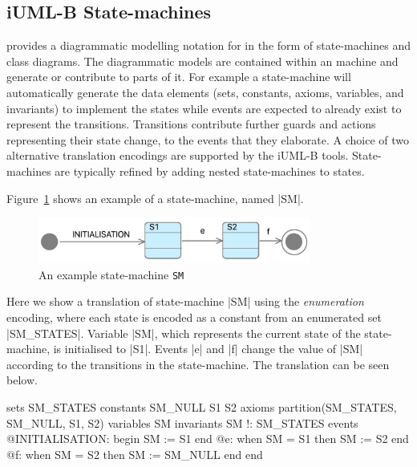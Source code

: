 
\subsection{iUML-B State-machines}
\label{sec:iumlb}

\iUMLB provides a diagrammatic modelling notation for \EventB in the form of state-machines and class diagrams. The diagrammatic models are contained within an \EventB machine and generate or contribute to parts of it. For example a state-machine will automatically generate the \EventB data elements (sets, constants, axioms, variables, and invariants) to implement the states while \EventB events are expected to already exist to represent the transitions. Transitions contribute further guards and actions representing their state change, to the events that they elaborate. A choice of two alternative translation encodings are supported by the iUML-B tools.  State-machines are typically refined by adding nested state-machines to states.

Figure~\ref{fig:iumlb-sm} shows an example of a state-machine, named |SM|.
\begin{figure}[!htbp]
	\centering
	\includegraphics[width=0.8\textwidth]{figures/iumlb-SM}
	\caption{An example \iUMLB state-machine \texttt{SM}}
	\label{fig:iumlb-sm}
\end{figure}
Here we show a translation of state-machine |SM| using the \emph{enumeration} encoding, where each state is encoded as a constant from an enumerated set |SM_STATES|.  Variable |SM|, which represents the current state of the state-machine, is initialised to |S1|. Events |e| and |f| change the value of |SM| according to the transitions in the state-machine.  The \EventB translation can be seen below.
\begin{EventBcode}
sets SM_STATES
constants SM_NULL S1 S2
axioms
    partition(SM_STATES, {SM_NULL}, {S1}, {S2})
variables SM
invariants SM !: SM_STATES
events
    @INITIALISATION: begin SM := S1 end
    @e: when SM = S1 then SM := S2 end
    @f: when SM = S2 then SM := SM_NULL end
end
\end{EventBcode}

